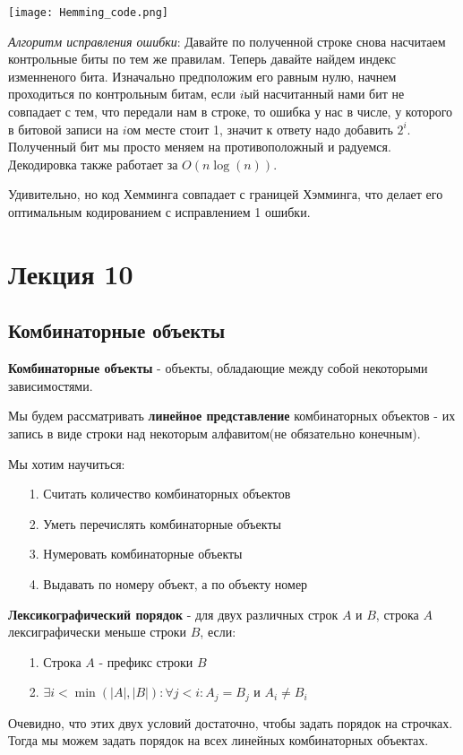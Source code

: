 \documentclass{article}
\begin{document}
\begin{center}
  \texttt{[image: Hemming\_code.png]}
\end{center}

\textit{Алгоритм исправления ошибки}: Давайте по полученной строке снова насчитаем контрольные биты по тем же правилам. Теперь давайте найдем индекс изменненого бита. Изначально предположим его равным нулю, начнем проходиться по контрольным битам, если $i$ый насчитанный нами бит не совпадает с тем, что передали нам в строке, то ошибка у нас в числе, у которого в битовой записи на $i$ом месте стоит 1, значит к ответу надо добавить $2^i$. Полученный бит мы просто меняем на противоположный и радуемся. Декодировка также работает за $O(n\log(n))$.

Удивительно, но код Хемминга совпадает с границей Хэмминга, что делает его оптимальным кодированием с исправлением 1 ошибки.

\section{Лекция 10}
\subsection{Комбинаторные объекты}
\textbf{Комбинаторные объекты} - объекты, обладающие между собой некоторыми зависимостями.

Мы будем рассматривать \textbf{линейное представление} комбинаторных объектов - их запись в виде строки над некоторым алфавитом(не обязательно конечным).

Мы хотим научиться:
\begin{enumerate}
\item[1.] Считать количество комбинаторных объектов
\item[2.] Уметь перечислять комбинаторные объекты
\item[3.] Нумеровать комбинаторные объекты 
\item[4.] Выдавать по номеру объект, а по объекту номер
\end{enumerate}
\textbf{Лексикографический порядок} - для двух различных строк $A$ и $B$, строка $A$ лексиграфически меньше строки $B$, если:
\begin{enumerate}
    \item[1.] Строка $A$ - префикс строки $B$
    \item[2.] $\exists i < \min(|A|, |B|): \forall j < i : A_j = B_j$ и $A_i \neq B_i$ 
\end{enumerate}
Очевидно, что этих двух условий достаточно, чтобы задать порядок на строчках. Тогда мы можем задать порядок на всех линейных комбинаторных объектах.
\end{document}
